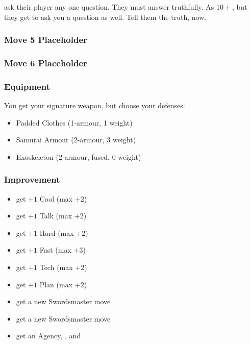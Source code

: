 {ask their player any one question. They must answer truthfully.}
{As $10+$, but they get to ask you a question as well. Tell them the truth, now.}

\subsubsection {Move 5 Placeholder} %

\subsubsection {Move 6 Placeholder} %

\subsubsection{Equipment}
You get your signature weapon, but choose your defenses:
\begin{itemize}
\item Padded Clothes (1-armour, 1 weight)
\item Samurai Armour (2-armour, 3 weight)
\item Exoskeleton (2-armour, fused, 0 weight)
\end{itemize}

\subsubsection{Improvement}
\begin{itemize}
\item get $+1$ Cool (max $+2$)
\item get $+1$ Talk (max $+2$)
\item get $+1$ Hard (max $+2$)
\item get $+1$ Fast (max $+3$)
\item get $+1$ Tech (max $+2$)
\item get $+1$ Plan (max $+2$)
\item get a new Swordsmaster move
\item get a new Swordsmaster move
\item get an Agency, , and 
\end{itemize}



